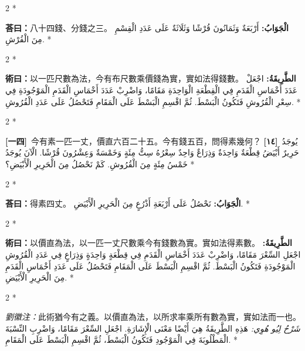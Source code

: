 \documentclass[11pt,a4paper]{article}
\newcommand{\ar}[1]{\arabicfont\beginR #1\endR}
\newcommand{\problemnum}[1]{\textbf{[\ignorespaces#1\unskip]}}
\newenvironment{bilingual}{%
  \begin{paracol}{2}%
  \switchcolumn[0]*%
}{%
  \end{paracol}%
}
\newcommand{\cnline}[1]{\switchcolumn[0]\noindent #1 \switchcolumn[1]}
\newcommand{\arline}[1]{\noindent\ar{#1} \switchcolumn[0]*}
\newenvironment{prob bilingual}{%
  \begin{paracol}{2}%
  \switchcolumn[0]*%
}{%
  \end{paracol}%
  \vspace{0.3em}%
}
\begin{document}
\begin{bilingual}
\cnline{\textcolor{answercolor}{\textbf{荅曰：}}八十四錢、分錢之三。}
\arline{\textcolor{answercolor}{\textbf{الْجَوَابُ:}} أَرْبَعَةٌ وَثَمَانُونَ قُرْشًا وَثَلَاثَةٌ عَلَى عَدَدِ الْقِسْمِ مِنَ الْقُرْشِ.}
\end{bilingual}

\begin{bilingual}
\cnline{%
\textcolor{methodcolor}{\textbf{術曰：}}以一匹尺數為法，今有布尺數乘價錢為實，實如法得錢數。
}
\arline{%
\textcolor{methodcolor}{\textbf{الطَّرِيقَةُ:}} اجْعَلْ عَدَدَ أَخْمَاسِ الْقَدَمِ فِي الْقِطْعَةِ الْوَاحِدَةِ مَقَامًا، وَاضْرِبْ عَدَدَ أَخْمَاسِ الْقَدَمِ الْمَوْجُودَةِ فِي سِعْرِ الْقُرُوشِ فَتَكُونُ الْبَسْطَ. ثُمَّ اقْسِمِ الْبَسْطَ عَلَى الْمَقَامِ فَتَحْصُلُ عَلَى عَدَدِ الْقُرُوشِ.
}
\end{bilingual}

\begin{bilingual}
\cnline{\problemnum{一四}\, 今有素一匹一丈，價直六百二十五。今有錢五百，問得素幾何？}
\arline{\problemnum{١٤}\, يُوجَدُ حَرِيرٌ أَبْيَضُ قِطْعَةٌ وَاحِدَةٌ وَذِرَاعٌ وَاحِدٌ سِعْرُهُ سِتُّ مِئَةٍ وَخَمْسَةٌ وَعِشْرُونَ قُرْشًا. الْآنَ يُوجَدُ خَمْسُ مِئَةٍ مِنَ الْقُرُوشِ. كَمْ نَحْصُلُ مِنَ الْحَرِيرِ الْأَبْيَضِ؟}
\end{bilingual}

\begin{bilingual}
\cnline{\textcolor{answercolor}{\textbf{荅曰：}}得素四丈。}
\arline{\textcolor{answercolor}{\textbf{الْجَوَابُ:}} نَحْصُلُ عَلَى أَرْبَعَةِ أَذْرُعٍ مِنَ الْحَرِيرِ الْأَبْيَضِ.}
\end{bilingual}

\begin{bilingual}
\cnline{%
\textcolor{methodcolor}{\textbf{術曰：}}以價直為法，以一匹一丈尺數乘今有錢數為實。實如法得素數。
}
\arline{%
\textcolor{methodcolor}{\textbf{الطَّرِيقَةُ:}} اجْعَلِ السِّعْرَ مَقَامًا، وَاضْرِبْ عَدَدَ أَخْمَاسِ الْقَدَمِ فِي قِطْعَةٍ وَاحِدَةٍ وَذِرَاعٍ فِي عَدَدِ الْقُرُوشِ الْمَوْجُودَةِ فَتَكُونُ الْبَسْطَ. ثُمَّ اقْسِمِ الْبَسْطَ عَلَى الْمَقَامِ فَتَحْصُلُ عَلَى عَدَدِ أَخْمَاسِ الْقَدَمِ مِنَ الْحَرِيرِ الْأَبْيَضِ.
}
\end{bilingual}

\begin{bilingual}
\cnline{%
\textcolor{commentarycolor}{\small\textit{劉徽注：}}此術猶今有之義。以價直為法，以所求率乘所有數為實，實如法而一也。
}
\arline{%
\textcolor{commentarycolor}{\small\textit{شَرْحُ لِيُو هُوِي:}} هَذِهِ الطَّرِيقَةُ هِيَ أَيْضًا مَعْنَى الْإِشَارَةِ. اجْعَلِ السِّعْرَ مَقَامًا، وَاضْرِبِ النِّسْبَةَ الْمَطْلُوبَةَ فِي الْمَوْجُودِ فَتَكُونُ الْبَسْطَ، ثُمَّ اقْسِمِ الْبَسْطَ عَلَى الْمَقَامِ.
}
\end{bilingual}
\end{document}
